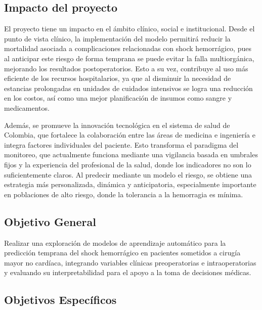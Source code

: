 \subsection{Impacto del proyecto}

El proyecto tiene un impacto en el ámbito clínico, social e institucional. Desde el punto de vista clínico, la implementación del modelo permitirá reducir la mortalidad asociada a complicaciones relacionadas con shock hemorrágico, pues al anticipar este riesgo de forma temprana se puede evitar la falla multiorgánica, mejorando los resultados postoperatorios. Esto a su vez, contribuye al uso más eficiente de los recursos hospitalarios, ya que al disminuir la necesidad de estancias prolongadas en unidades de cuidados intensivos se logra una reducción en los costos, así como una mejor planificación de insumos como sangre y medicamentos.

Además, se promueve la innovación tecnológica en el sistema de salud de Colombia, que fortalece la colaboración entre las áreas de medicina e ingeniería e integra factores individuales del paciente. Esto transforma el paradigma del monitoreo, que actualmente funciona mediante una vigilancia basada en umbrales fijos y la experiencia del profesional de la salud, donde los indicadores no son lo suficientemente claros. Al predecir mediante un modelo el riesgo, se obtiene una estrategia más personalizada, dinámica y anticipatoria, especialmente importante en poblaciones de alto riesgo, donde la tolerancia a la hemorragia es mínima.

\subsection{Objetivo General}

Realizar una exploración de modelos de aprendizaje automático para la predicción temprana del shock hemorrágico en pacientes sometidos a cirugía mayor no cardíaca, integrando variables clínicas preoperatorias e intraoperatorias y evaluando su interpretabilidad para el apoyo a la toma de decisiones médicas.

\subsection{Objetivos Específicos}

